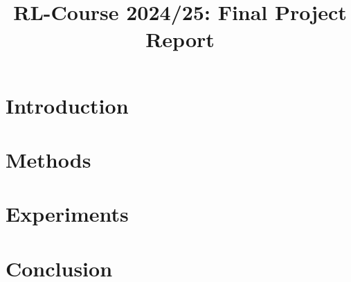 \documentclass[11pt]{article}
\title{RL-Course 2024/25: Final Project Report}
\author{\theteam}
\begin{document}
\maketitle

\section{Introduction}


\section{Methods}




\section{Experiments}




\section{Conclusion}


\newpage



\end{document}
